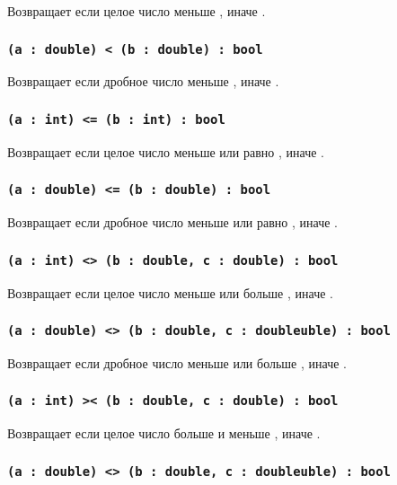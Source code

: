 Возвращает \true{} если целое число  меньше , иначе \false{}.

\subsubsection{\lstinline|(a : double) < (b : double) : bool|}

Возвращает \true{} если дробное число  меньше , иначе \false{}.

\subsubsection{\lstinline|(a : int) <= (b : int) : bool|}

Возвращает \true{} если целое число  меньше или равно , иначе \false{}.

\subsubsection{\lstinline|(a : double) <= (b : double) : bool|}

Возвращает \true{} если дробное число  меньше или равно , иначе \false{}.

\subsubsection{\lstinline|(a : int) <> (b : double, c : double) : bool|}

Возвращает \true{} если целое число  меньше  или больше , иначе \false{}.

\subsubsection{\lstinline|(a : double) <> (b : double, c : doubleuble) : bool|}

Возвращает \true{} если дробное число  меньше  или больше , иначе \false{}.

\subsubsection{\lstinline|(a : int) >< (b : double, c : double) : bool|}

Возвращает \true{} если целое число  больше  и меньше , иначе \false{}.

\subsubsection{\lstinline|(a : double) <> (b : double, c : doubleuble) : bool|}

